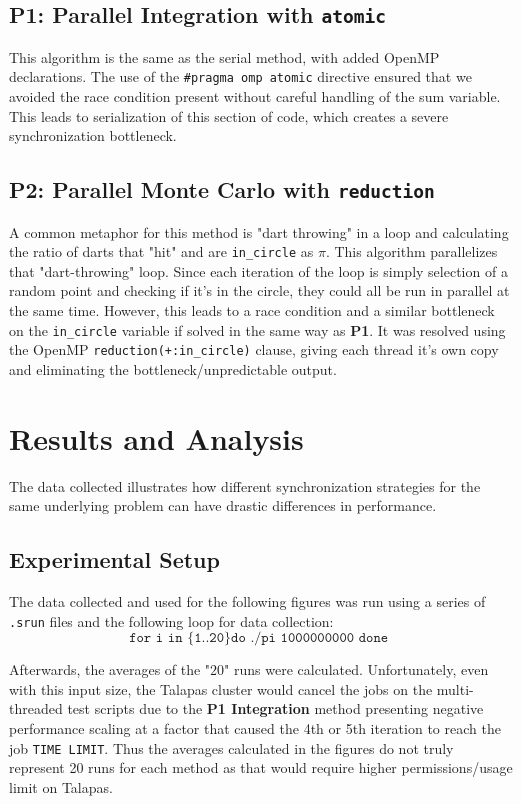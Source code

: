 \documentclass[twocolumn]{article}
\begin{document}
\subsection{P1: Parallel Integration with \texttt{atomic}}
This algorithm is the same as the serial method, with added OpenMP declarations. The use of the \texttt{\#pragma~omp~atomic} directive ensured that we avoided the race condition present without careful handling of the sum variable. This leads to serialization of this section of code, which creates a severe synchronization bottleneck.

\subsection{P2: Parallel Monte Carlo with \texttt{reduction}}
A common metaphor for this method is "dart throwing" in a loop and calculating the ratio of darts that "hit" and are \texttt{in\_circle} as $\pi$. This algorithm parallelizes that "dart-throwing" loop. Since each iteration of the loop is simply selection of a random point and checking if it's in the circle, they could all be run in parallel at the same time. However, this leads to a race condition and a similar bottleneck on the \texttt{in\_circle} variable if solved in the same way as \textbf{P1}. It was resolved using the OpenMP \texttt{reduction(+:in\_circle)} clause, giving each thread it's own copy and eliminating the bottleneck/unpredictable output.


\section{Results and Analysis}
The data collected illustrates how different synchronization strategies for the same underlying problem can have drastic differences in performance.

\subsection{Experimental Setup}

The data collected and used for the following figures was run using a series of \texttt{.srun} files and the following loop for data collection:
$$\texttt{for i in \{1..20\} do ./pi 1000000000 done } $$

Afterwards, the averages of the "$20$" runs were calculated.
Unfortunately, even with this input size, the Talapas cluster would cancel the jobs on the multi-threaded test scripts due to the \textbf{P1 Integration} method presenting negative performance scaling at a factor that caused the 4th or 5th iteration to reach the job \texttt{TIME LIMIT}.
Thus the averages calculated in the figures do not truly represent 20 runs for each method as that would require higher permissions/usage limit on Talapas.
\end{document}
